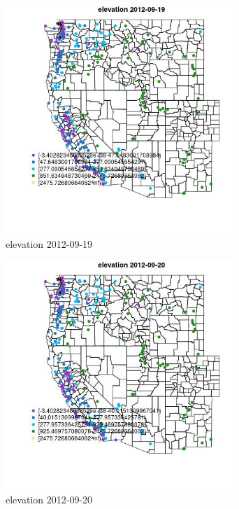\clearpage 

\begin{figure} 
\centering  
\includegraphics[width=0.77\textwidth]{Code_Outputs/ML_input_report_ML_input_PM25_Step5_part_d_de_duplicated_aves_ML_input_MapObselevation2012-09-19.jpg} 
\caption{\label{fig:ML_input_report_ML_input_PM25_Step5_part_d_de_duplicated_aves_ML_inputMapObselevation2012-09-19}elevation 2012-09-19} 
\end{figure} 
 

\begin{figure} 
\centering  
\includegraphics[width=0.77\textwidth]{Code_Outputs/ML_input_report_ML_input_PM25_Step5_part_d_de_duplicated_aves_ML_input_MapObselevation2012-09-20.jpg} 
\caption{\label{fig:ML_input_report_ML_input_PM25_Step5_part_d_de_duplicated_aves_ML_inputMapObselevation2012-09-20}elevation 2012-09-20} 
\end{figure} 
 


